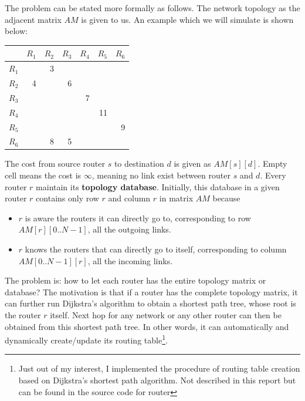 \documentclass[12pt]{article}  %
\theoremstyle{definition}
\theoremstyle{remark}
\begin{document}
The problem can be stated more formally as follows. The network topology as the adjacent matrix $AM$ is given to us.
An example which we will simulate is shown below:
\begin{center}
\begin{tabular}{|r|r|r|r|r|r|r|}        %
\hline                                  %
 & $R_1$ & $R_2$ & $R_3$ & $R_4$ & $R_5$ & $R_6$ \\ %
\hline
$R_1$ &   & 3 &   &   &    & \\
\hline
$R_2$ & 4 &   & 6 &   &    & \\
\hline
$R_3$ &   &   &   & 7 &    & \\
\hline
$R_4$ &   &   &   &   & 11 & \\
\hline
$R_5$ &   &   &   &   &    & 9 \\
\hline
$R_6$ &   & 8 & 5 &   &    & \\
\hline
\end{tabular}
\end{center}
The cost from source router $s$ to destination $d$ is given as $AM[s][d]$.
Empty cell means the cost is $\infty$, meaning no link exist between router $s$ and $d$.
Every router $r$ maintain its \textbf{topology database}.
Initially, this database in a given router $r$ contains only row $r$ and column $r$ in matrix $AM$ because
\begin{itemize}
        \item $r$ is aware the routers it can directly go to, corresponding to row $AM[r][0..N-1]$, all the outgoing links.
        \item $r$ knows the routers that can directly go to itself, corresponding to column $AM[0..N-1][r]$, all the incoming links.
\end{itemize}

The problem is: how to let each router has the entire topology matrix or database?
The motivation is that if a router has the complete topology matrix, it can further run Dijkstra's algorithm to obtain a shortest path tree, whose root is the router $r$ itself.
Next hop for any network or any other router can then be obtained from this shortest path tree.
In other words, it can automatically and dynamically create/update its routing table\footnote{Just out of my interest, I implemented the procedure of routing table creation based on Dijkstra's shortest path algorithm.
Not described in this report but can be found in the source code for router}.
\end{document}
